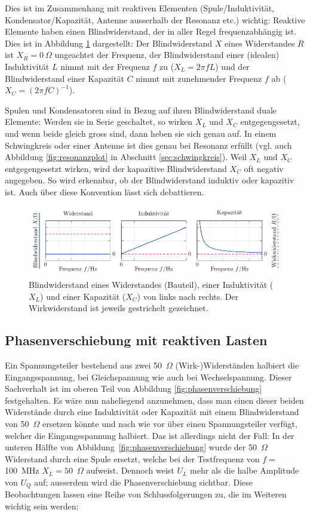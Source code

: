 \documentclass[twoside,a4paper,11pt,halfparskip,DIV=11,notitlepage]{scrartcl}
\begin{document}
Dies ist im Zusammenhang mit reaktiven Elementen (Spule/Induktivität,
Kondensator/Kapazität, Antenne ausserhalb der Resonanz etc.) wichtig: Reaktive
Elemente haben einen Blindwiderstand, der in aller Regel frequenzabhängig ist.
Dies ist in Abbildung \ref{fig:XRLC} dargestellt: Der Blindwiderstand $X$ eines
Widerstandes $R$ ist $X_R=0~\Omega$ ungeachtet der Frequenz, der Blindwiderstand
einer (idealen) Induktivität $L$ nimmt mit der Frequenz $f$ zu ($X_L=2\pi f L$)
und der Blindwiderstand einer Kapazität $C$ nimmt mit zunehmender Frequenz $f$
ab ($X_C=(2\pi f C)^{-1}$).

Spulen und Kondensatoren sind in Bezug auf ihren Blindwiderstand duale Elemente:
Werden sie in Serie geschaltet, so wirken $X_L$ und $X_C$ entgegengesetzt, und
wenn beide gleich gross sind, dann heben sie sich genau auf. In einem
Schwingkreis oder einer Antenne ist dies genau bei Resonanz erfüllt (vgl. auch
Abbildung \ref{fig:resonanzplot} in Abschnitt \ref{sec:schwingkreis}). Weil
$X_L$ und $X_C$ entgegengesetzt wirken, wird der kapazitive Blindwiderstand
$X_C$ oft negativ angegeben. So wird erkennbar, ob der Blindwiderstand induktiv
oder kapazitiv ist. Auch über diese Konvention lässt sich debattieren.

\begin{figure}
    \includegraphics{figures/reactance/reactance.pdf}
    \caption{Blindwiderstand eines Widerstandes (Bauteil), einer Induktivität ($X_L$) und einer
    Kapazität ($X_C$) von links nach rechts. Der Wirkwiderstand ist jeweils gestrichelt gezeichnet.}
    \label{fig:XRLC}
\end{figure}

\subsection{Phasenverschiebung mit reaktiven Lasten}
Ein Spannungsteiler bestehend aus zwei 50~$\Omega$ (Wirk-)Widerständen
halbiert die Eingangsspannung, bei Gleichspannung wie auch bei Wechselspannung.
Dieser Sachverhalt ist im oberen Teil von Abbildung \ref{fig:phasenverschiebung} festgehalten.
Es wäre nun naheliegend anzunehmen, dass man einen dieser beiden Widerstände
durch eine Induktivität oder Kapazität mit einem Blindwiderstand von 50~$\Omega$
ersetzen könnte und nach wie vor über einen Spannungsteiler verfügt, welcher
die Eingangsspannung halbiert. Das ist allerdings nicht der Fall:
In der unteren Hälfte von Abbildung~\ref{fig:phasenverschiebung} wurde der 50~$\Omega$
Widerstand durch eine Spule ersetzt, welche bei der Testfrequenz von $f=$100~MHz
$X_L=50$~$\Omega$ aufweist. Dennoch weist $U_L$ mehr als die halbe Amplitude von
$U_Q$ auf; ausserdem wird die Phasenverschiebung sichtbar. Diese Beobachtungen
lassen eine Reihe von Schlussfolgerungen zu, die im Weiteren wichtig sein werden:
\end{document}
